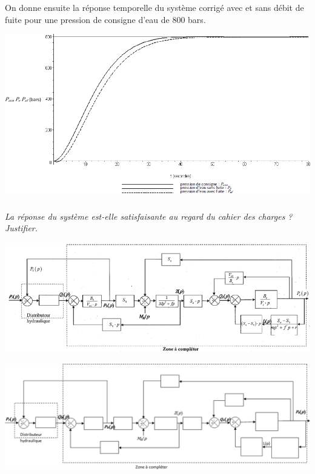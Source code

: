 \documentclass[10pt,fleqn]{article} %
\begin{document}
\begin{multicols}{2}
On donne ensuite la réponse temporelle du système corrigé avec et sans débit de fuite pour une pression de consigne d’eau de 800 bars.


\begin{center}
\includegraphics[width=\linewidth]{images_02/fig_09}
\end{center}

\subparagraph{}
\textit{La réponse du système est-elle satisfaisante au regard du cahier des charges ? Justifier.}
\ifprof
\begin{corrige}
\end{corrige}
\else
\fi

\end{multicols}

\ifprof
\begin{center}
\includegraphics[width=\linewidth]{images_02/cor_01}
\end{center}
\else
\begin{center}
\includegraphics[width=\linewidth]{images_02/fig_10}
\end{center}
\fi
\end{document}
